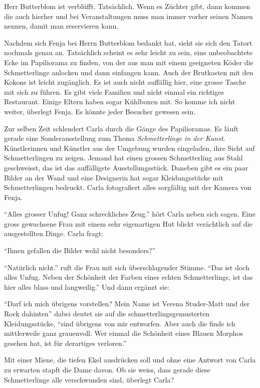 Herr Butterblom ist verblüfft. Tatsächlich. Wenn es Züchter gibt, dann kommen die auch hierher und bei Veranstaltungen muss man immer vorher seinen Namen nennen, damit man reservieren kann. 

Nachdem sich Fenja bei Herrn Butterblom bedankt hat, sieht sie sich den Tatort nochmals genau an. Tatsächlich scheint es sehr leicht zu sein, eine unbeobachtete Ecke im Papiliorama zu finden, von der aus man mit einem geeigneten Köder die Schmetterlinge anlocken und dann einfangen kann. Auch der Brutkasten mit den Kokons ist leicht zugänglich. Es ist auch nicht auffällig hier, eine grosse Tasche mit sich zu führen. Es gibt viele Familien und nicht einmal ein richtiges Restaurant. Einige Eltern haben sogar Kühlboxen mit. So komme ich nicht weiter, überlegt Fenja. Es könnte jeder Besucher gewesen sein.
\begin{center}
\end{center}
Zur selben Zeit schlendert Carla durch die Gänge des Papilioramas. Es läuft gerade eine Sonderausstellung zum Thema \emph{Schmetterlinge in der Kunst}. Künstlerinnen und Künstler aus der Umgebung wurden eingeladen, ihre Sicht auf Schmetterlingen zu zeigen. Jemand hat einen grossen Schmetterling aus Stahl geschweisst, das ist das auffälligste Ausstellungsstück. Daneben gibt es ein paar Bilder an der Wand und eine Designerin hat sogar Kleidungsstücke mit Schmetterlingen bedruckt. Carla fotografiert alles sorgfältig mit der Kamera von Fenja.

\enquote{Alles grosser Unfug! Ganz schreckliches Zeug.} hört Carla neben sich sagen. Eine gross gewachsene Frau mit einem sehr eigenartigen Hut blickt verächtlich auf die ausgestellten Dinge. Carla fragt:

\enquote{Ihnen gefallen die Bilder wohl nicht besonders?}

\enquote{Natürlich nicht.} ruft die Frau mit sich überschlagender Stimme. \enquote{Das ist doch alles Unfug. Neben der Schönheit der Farben eines echten Schmetterlings, ist das hier alles blass und langweilig.} Und dann ergänzt sie:

\enquote{Darf ich mich übrigens vorstellen? Mein Name ist Verena Studer-Matt und der Rock dahinten} dabei deutet sie auf die schmetterlingsgemusterten Kleidungsstücke, \enquote{sind übrigens von mir entworfen. Aber auch die finde ich mittlerweile ganz grauenvoll. Wer einmal die Schönheit eines Blauen Morphos gesehen hat, ist für derartiges verloren.} 


Mit einer Miene, die tiefen Ekel ausdrücken soll und ohne eine Antwort von Carla zu erwarten stapft die Dame davon. Ob sie weiss, dass gerade diese Schmetterlinge alle verschwunden sind, überlegt Carla?

